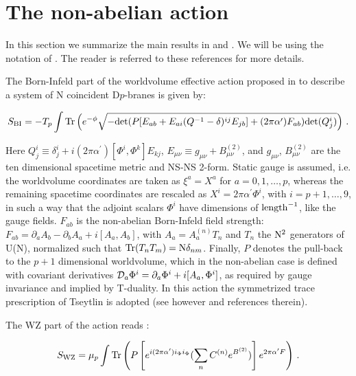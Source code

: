 \documentclass[12pt,a4paper]{article}
\begin{document}
 
\section{The non-abelian action}

In this section we summarize the main results in \cite{Myers}
and \cite{TvR}. We will be using the notation of \cite{Myers}.
The reader is referred to these references for more details.

The Born-Infeld part of the worldvolume effective action proposed
in \cite{Myers,TvR} to describe a system of N coincident 
D$p$-branes is given by:

\begin{equation}
\label{nonabDBI}
S_{\rm BI}=-T_p\int {\rm Tr}\left( e^{-\phi}
\sqrt{-{\rm det}(P[E_{ab}+E_{ai}(Q^{-1}-\delta)^{ij}E_{jb}]
+(2\pi\alpha^\prime)F_{ab}){\rm det}(Q^i_j)}\right)\, .
\end{equation}

\noindent Here
$Q^i_j\equiv\delta^i_j+i(2\pi\alpha^\prime)[\Phi^i,\Phi^k]E_{kj}$,
$E_{\mu\nu}\equiv g_{\mu\nu}+B_{\mu\nu}^{(2)}$, 
and $g_{\mu\nu}$, $B_{\mu\nu}^{(2)}$ are
the ten dimensional spacetime metric and NS-NS 2-form. 
Static gauge is assumed, i.e. the worldvolume coordinates are taken as 
$\xi^a=X^a$ for $a=0,1,\dots ,p$, whereas  
the remaining spacetime coordinates are rescaled as 
$X^i=2\pi\alpha^\prime \Phi^i$, with $i=p+1,\dots ,9$, in such a way
that the adjoint scalars
$\Phi^i$ have dimensions of ${\rm length}^{-1}$, like the gauge fields. 
$F_{ab}$ is
the non-abelian Born-Infeld field strength:
$F_{ab}=\partial_a A_b-\partial_b A_a +i[A_a, A_b]$, with 
$A_a=A_a^{(n)}T_n$ and $T_n$  
the ${\rm N}^2$ generators of U(N), normalized such that 
${\rm Tr}(T_nT_m)={\rm N}\delta_{nm}$. Finally, $P$ denotes the 
pull-back to the $p+1$ dimensional worldvolume, 
which in the non-abelian case is defined with
covariant derivatives \cite{Hull}
${\cal D}_a \Phi^i=\partial_a \Phi^i+i[A_a, \Phi^i]$, as 
required by gauge invariance and implied by T-duality. 
In this action the
symmetrized trace prescription of Tseytlin \cite{Tseytlin} is adopted
(see however \cite{eric} and references therein).


The WZ part of the action reads \cite{Myers,TvR}:

\begin{equation}
\label{nonabWZ}
S_{\rm WZ}=\mu_p\int {\rm Tr}\left( P\left[e^{i(2\pi\alpha^\prime)
i_\Phi i_\Phi}(\sum_n C^{(n)}e^{B^{(2)}})\right]
e^{2\pi\alpha^\prime F}\right)\, .
\end{equation}
\end{document}
